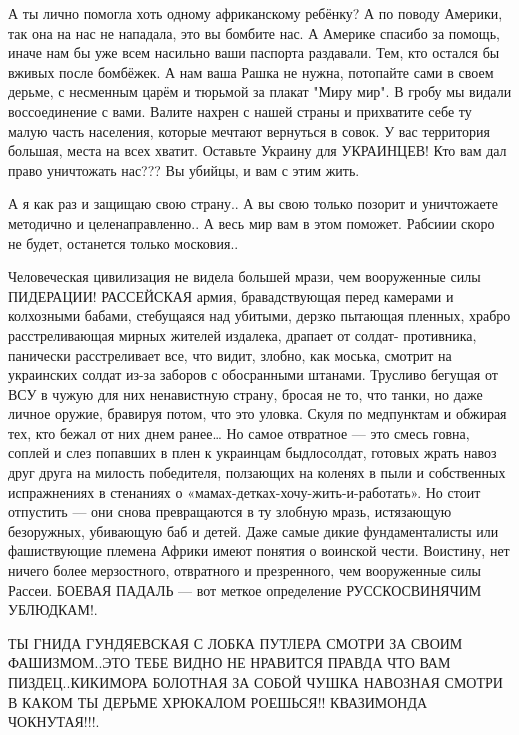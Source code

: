 А ты лично помогла хоть одному африканскому ребёнку? А по поводу Америки, так
она на нас не нападала, это вы бомбите нас. А Америке спасибо за помощь, иначе
нам бы уже всем насильно ваши паспорта раздавали. Тем, кто остался бы вживых
после бомбёжек. А нам ваша Рашка не нужна, потопайте сами в своем дерьме, с
несменным царём и тюрьмой за плакат "Миру мир". В гробу мы видали воссоединение
с вами. Валите нахрен с нашей страны и прихватите себе ту малую часть
населения, которые мечтают вернуться в совок. У вас территория большая, места
на всех хватит. Оставьте Украину для УКРАИНЦЕВ! Кто вам дал право уничтожать
нас??? Вы убийцы, и вам с этим жить.

А я как раз и защищаю свою страну..
А вы свою только позорит и уничтожаете методично и целенаправленно..
А весь мир вам в этом поможет. Рабсиии скоро не будет, останется только московия..

Человеческая цивилизация не видела большей мрази, чем вооруженные силы ПИДЕРАЦИИ!
РАССЕЙСКАЯ армия, бравадствующая перед камерами и колхозными бабами, стебущаяся над убитыми, дерзко пытающая пленных, храбро расстреливающая мирных жителей издалека, драпает от солдат- противника, панически расстреливает все, что видит, злобно, как моська, смотрит на украинских солдат из-за заборов с обосранными штанами.
Трусливо бегущая от ВСУ в чужую для них ненавистную страну, бросая не то, что танки, но даже личное оружие, бравируя потом, что это уловка. Скуля по медпунктам и обжирая тех, кто бежал от них днем ранее…
Но самое отвратное — это смесь говна, соплей и слез попавших в плен к украинцам быдлосолдат, готовых жрать навоз друг друга на милость победителя, ползающих на коленях в пыли и собственных испражнениях в стенаниях о «мамах-детках-хочу-жить-и-работать».
Но стоит отпустить — они снова превращаются в ту злобную мразь, истязающую безоружных, убивающую баб и детей. Даже самые дикие фундаменталисты или фашиствующие племена Африки имеют понятия о воинской чести.
Воистину, нет ничего более мерзостного, отвратного и презренного, чем вооруженные силы Рассеи. БОЕВАЯ ПАДАЛЬ — вот меткое определение РУССКОСВИНЯЧИМ УБЛЮДКАМ!.

ТЫ ГНИДА ГУНДЯЕВСКАЯ С ЛОБКА ПУТЛЕРА СМОТРИ ЗА СВОИМ ФАШИЗМОМ..ЭТО ТЕБЕ ВИДНО
НЕ НРАВИТСЯ ПРАВДА ЧТО ВАМ ПИЗДЕЦ..КИКИМОРА БОЛОТНАЯ ЗА СОБОЙ ЧУШКА НАВОЗНАЯ
СМОТРИ В КАКОМ ТЫ ДЕРЬМЕ ХРЮКАЛОМ РОЕШЬСЯ!!   КВАЗИМОНДА ЧОКНУТАЯ!!!.


